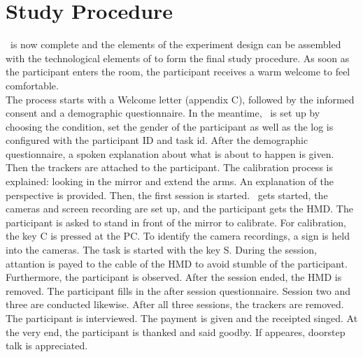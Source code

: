 \section{Study Procedure}
\label{sec:procedure}
\exgo\ is now complete and the elements of the experiment design can be assembled with the technological elements of \exgo to form the final study procedure.
As soon as the participant enters the room, the participant receives a warm welcome to feel comfortable.\\
The process starts with a Welcome letter (appendix C), followed by the informed consent and a demographic questionnaire. In the meantime, \exgo\ is set up by choosing the condition, set the gender of the participant as well as the log is configured with the participant ID and task id. After the demographic questionnaire, a spoken explanation about what is about to happen is given. Then the trackers are attached to the participant. The calibration process is explained: looking in the mirror and extend the arms. An explanation of the perspective is provided. Then, the first session is started. \exgo\ gets started, the cameras and screen recording are set up, and the participant gets the HMD. The participant is asked to stand in front of the mirror to calibrate. For calibration, the key C is pressed at the PC. To identify the camera recordings, a sign is held into the cameras. The task is started with the key S. During the session, attantion is payed to the cable of the HMD to avoid stumble of the participant. Furthermore, the participant is observed. After the session ended, the HMD is removed. The participant fills in the after session questionnaire. Session two and three are conducted likewise. After all three sessions, the trackers are removed. The participant is interviewed. The payment is given and the receipted singed. At the very end, the participant is thanked and said goodby. If appeares, doorstep talk is appreciated.

